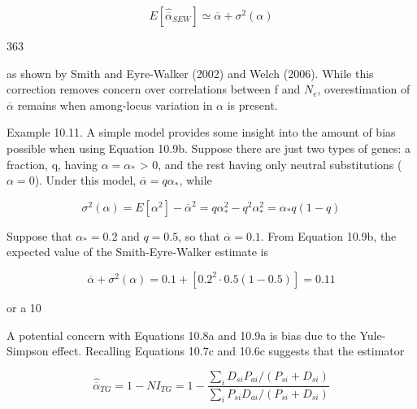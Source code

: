 \documentclass{article}
\begin{document}
\begin{equation}
E\left[\widehat{\overline{\alpha}}_{SEW}\right]\simeq\overline{\alpha}+\sigma^{2}(\alpha)
\tag{10.9b}
\label{eq:10_9b}
\end{equation}

363

as shown by Smith and Eyre-Walker (2002) and Welch (2006). While this correction removes concern over correlations between f and  $ N_{e} $, overestimation of  $ \overline{\alpha} $ remains when among-locus variation in  $ \alpha $ is present.

Example 10.11. A simple model provides some insight into the amount of bias possible when using Equation 10.9b. Suppose there are just two types of genes: a fraction, q, having  $ \alpha = \alpha_* $ > 0, and the rest having only neutral substitutions ( $ \alpha = 0 $). Under this model,  $ \overline{\alpha} = q\alpha_* $, while

\begin{equation}
\sigma^{2}(\alpha)=E[\alpha^{2}]-\overline{\alpha}^{2}=q\alpha_{*}^{2}-q^{2}\alpha_{*}^{2}=\alpha_{*}q(1-q)
\end{equation}

Suppose that  $ \alpha_{*} = 0.2 $ and  $ q = 0.5 $, so that  $ \overline{\alpha} = 0.1 $. From Equation 10.9b, the expected value of the Smith-Eyre-Walker estimate is

\begin{equation}
\overline{\alpha}+\sigma^{2}(\alpha)=0.1+\left[0.2^{2}\cdot0.5(1-0.5)\right]=0.11
\end{equation}

or a 10%

A potential concern with Equations 10.8a and 10.9a is bias due to the Yule-Simpson effect. Recalling Equations 10.7c and 10.6c suggests that the estimator

\begin{equation}
\widehat{\overline{\alpha}}_{TG}=1-NI_{TG}=1-\frac{\sum_{i}D_{si}P_{ai}/(P_{si}+D_{si})}{\sum_{i}P_{si}D_{ai}/(P_{si}+D_{si})}
\tag{10.9c}
\label{eq:10_9c}
\end{equation}
\end{document}
